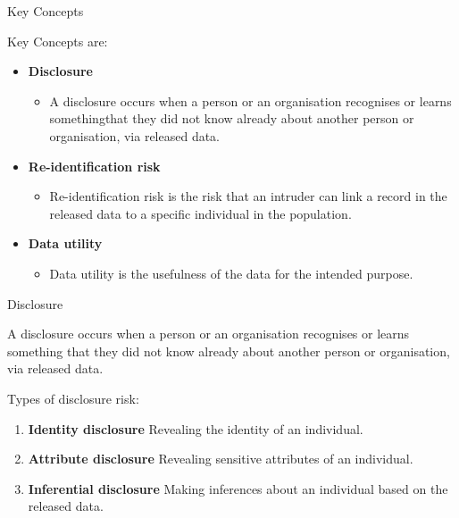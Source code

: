 \documentclass[
	aspectratio = 169
 ]{beamer}
\begin{document}
\begin{frame}{Key Concepts}

Key Concepts are:

\begin{itemize}
\tightlist
\item
  \textbf{Disclosure}

  \begin{itemize}
  \tightlist
  \item
    A disclosure occurs when a person or an organisation recognises or
    learns somethingthat they did not know already about another person
    or organisation, via released data.
  \end{itemize}
\end{itemize}

\pause

\begin{itemize}
\tightlist
\item
  \textbf{Re-identification risk}

  \begin{itemize}
  \tightlist
  \item
    Re-identification risk is the risk that an intruder can link a
    record in the released data to a specific individual in the
    population.
  \end{itemize}
\end{itemize}

\pause

\begin{itemize}
\tightlist
\item
  \textbf{Data utility}

  \begin{itemize}
  \tightlist
  \item
    Data utility is the usefulness of the data for the intended purpose.
  \end{itemize}
\end{itemize}
\end{frame}

\begin{frame}{Disclosure}

A disclosure occurs when a person or an organisation recognises or
learns something that they did not know already about another person or
organisation, via released data.

Types of disclosure risk:

\begin{enumerate}
[(1)]
\tightlist
\item
  \textbf{Identity disclosure} Revealing the identity of an individual.
  \vspace{0.5cm}
\item
  \textbf{Attribute disclosure} Revealing sensitive attributes of an
  individual. \vspace{0.5cm}
\item
  \textbf{Inferential disclosure} Making inferences about an individual
  based on the released data.
\end{enumerate}
\end{frame}
\end{document}
